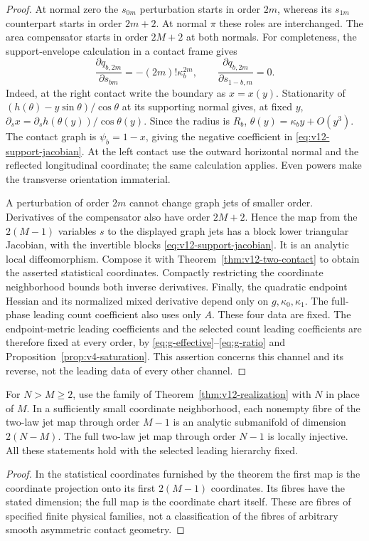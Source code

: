 \begin{proof}
At normal zero the $s_{0m}$ perturbation starts in order $2m$,
whereas its $s_{1m}$ counterpart starts in order $2m+2$.
At normal $\pi$ these roles are interchanged. The area compensator
starts in order $2M+2$ at both normals. For completeness, the
support-envelope calculation in a contact frame gives
\begin{equation}\label{eq:v12-support-jacobian}
 \frac{\partial q_{b,2m}}{\partial s_{bm}}
                  =-(2m)!\kappa_b^{2m},\qquad
 \frac{\partial q_{b,2m}}{\partial s_{1-b,m}}=0.
\end{equation}
Indeed, at the right contact write the boundary as $x=x(y)$.
Stationarity of $(h(\theta)-y\sin\theta)/\cos\theta$ at its
supporting normal gives, at fixed $y$,
$\partial_s x=\partial_s h(\theta(y))/\cos\theta(y)$.
Since the radius is $R_b$, $\theta(y)=\kappa_b y+O(y^3)$.
The contact graph is $\psi_b=1-x$, giving the negative coefficient
in \eqref{eq:v12-support-jacobian}. At the left contact use the
outward horizontal normal and the reflected longitudinal coordinate;
the same calculation applies. Even powers make the transverse
orientation immaterial.

A perturbation of order $2m$ cannot change graph jets of smaller
order. Derivatives of the compensator also have order $2M+2$.
Hence the map from the $2(M-1)$ variables $s$ to the displayed graph
jets has a block lower triangular Jacobian, with the invertible
blocks \eqref{eq:v12-support-jacobian}. It is an analytic local
diffeomorphism. Compose it with Theorem~\ref{thm:v12-two-contact}
to obtain the asserted statistical coordinates. Compactly restricting
the coordinate neighborhood bounds both inverse derivatives.
Finally, the quadratic endpoint Hessian and its normalized mixed
derivative depend only on $g,\kappa_0,\kappa_1$.
The full-phase leading count coefficient also uses only $A$.
These four data are fixed. The endpoint-metric leading coefficients
and the selected count leading coefficients are therefore fixed at
every order, by \eqref{eq:g-effective}--\eqref{eq:g-ratio} and
Proposition~\ref{prop:v4-saturation}. This assertion concerns this
channel and its reverse, not the leading data of every other channel.
\end{proof}

\begin{corollary}
\label{cor:v12-fibres}
For $N>M\ge2$, use the family of Theorem~\ref{thm:v12-realization}
with $N$ in place of $M$. In a sufficiently small coordinate
neighborhood, each nonempty fibre of the two-law jet map through
order $M-1$ is an analytic submanifold of dimension $2(N-M)$.
The full two-law jet map through order $N-1$ is locally injective.
All these statements hold with the selected leading hierarchy fixed.
\end{corollary}
\begin{proof}
In the statistical coordinates furnished by the theorem the first
map is the coordinate projection onto its first $2(M-1)$
coordinates. Its fibres have the stated dimension; the full map is
the coordinate chart itself. These are fibres of specified finite
physical families, not a classification of the fibres of arbitrary
smooth asymmetric contact geometry.
\end{proof}


